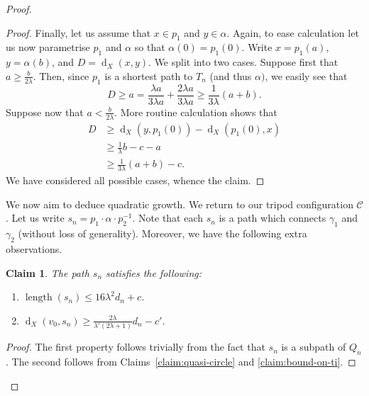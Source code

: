 \documentclass[11pt,a4paper]{amsart}
\DeclareMathOperator{\length}{length}
\DeclareMathOperator{\dist}{d}
\newtheorem{claim}[theorem]{Claim}
\theoremstyle{definition}
\newcommand{\crosshair}{\mathcal{C}}
\begin{document}
\begin{proof}
\begin{proof}
        Finally, let us assume that $x \in p_1$ and $y \in \alpha$. Again, to ease calculation let us now parametrise $p_1$ and $\alpha$ so that $\alpha(0) = p_1(0)$. Write $x = p_1(a)$, $y = \alpha(b)$, and $D = \dist_X(x,y)$. We split into two cases. Suppose first that $a \geq \frac b{2\lambda}$. Then, since $p_1$ is a shortest path to $T_n$ (and thus $\alpha)$, we easily see that 
        $$
        D  \geq a = \frac{\lambda a}{3\lambda a} + \frac{2\lambda a}{3\lambda a} \geq \frac{1}{3\lambda}(a+b).
        $$
        Suppose now that $a < \frac{b}{2\lambda}$. More routine calculation shows that
        \begin{align*}
            D &\geq \dist_X(y,p_1(0)) - \dist_X(p_1(0),x) \\
            & \geq \frac1 \lambda b - c- a \\
            & \geq \frac 1 {3\lambda}(a+b) -c.
        \end{align*}
        We have considered all possible cases, whence the claim.
    \end{proof}

    We now aim to deduce quadratic growth. We return to our tripod configuration $\crosshair$. Let us write $s_n = p_1 \cdot \alpha \cdot p_2^{-1}$. Note that each $s_n$ is a path which connects $\gamma_1$ and $\gamma_2$ (without loss of generality). Moreover, we have the following extra observations.

    \begin{claim}\label{claim:sn-properties}
        The path $s_n$ satisfies the following:
        \begin{enumerate}
            \item\label{itm:length-sn} $\length(s_n) \leq 16\lambda^2d_n + c$.

            \item\label{itm:dist-sn} $\dist_X(v_0,s_n) \geq \frac{2\lambda}{\lambda'(2\lambda+1)}d_n - c'$.
        \end{enumerate}
    \end{claim}

    \begin{proof}
        The first property follows trivially from the fact that $s_n$ is a subpath of $Q_n$. The second follows from Claims~\ref{claim:quasi-circle} and \ref{claim:bound-on-ti}.
    \end{proof}


\end{proof}
\end{document}

